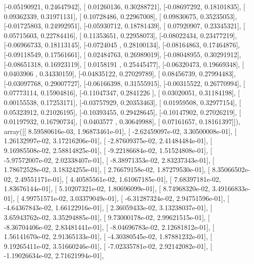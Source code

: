 \documentclass{article}
\begin{document}
       [-0.05190921,  0.24647942],
       [ 0.01260136,  0.30288721],
       [-0.08697292,  0.18101835],
       [ 0.09362339,  0.31971131],
       [ 0.10728486,  0.22967008],
       [ 0.09830675,  0.35235053],
       [-0.01725803,  0.24992951],
       [-0.05930712,  0.18781439],
       [ 0.07920907,  0.23345321],
       [ 0.05715603,  0.22784416],
       [ 0.11353651,  0.22958073],
       [-0.08022434,  0.23477219],
       [-0.06966733,  0.18113145],
       [-0.0724045 ,  0.28100134],
       [-0.08164863,  0.17464876],
       [-0.09118549,  0.17561661],
       [ 0.02484763,  0.26989019],
       [-0.08048955,  0.30291912],
       [-0.08651318,  0.16923119],
       [ 0.0158191 ,  0.25445477],
       [-0.06320473,  0.19669348],
       [ 0.0403906 ,  0.34330159],
       [-0.04835122,  0.27029789],
       [ 0.08456739,  0.27994483],
       [-0.03097768,  0.29007727],
       [-0.06166398,  0.31555915],
       [-0.00315522,  0.26770994],
       [ 0.07773114,  0.15904816],
       [-0.11047347,  0.2841226 ],
       [ 0.03020051,  0.31184198],
       [ 0.00155538,  0.17253171],
       [-0.03757929,  0.20353463],
       [ 0.01959508,  0.32977154],
       [ 0.05323912,  0.21026195],
       [-0.10393455,  0.29428645],
       [-0.10147902,  0.27026219],
       [ 0.01197932,  0.16790734],
       [ 0.0403577 ,  0.30649988],
       [ 0.07161657,  0.18161397]]), array([[  8.59580616e-03,   1.96873461e-01],
       [ -2.62459097e-02,   3.30500008e-01],
       [  1.26132997e-02,   3.17216206e-01],
       [ -2.87609375e-02,   2.41484484e-01],
       [  9.16985508e-02,   2.58814825e-01],
       [ -9.22186684e-02,   1.51524808e-01],
       [ -5.97572007e-02,   2.02338407e-01],
       [ -8.38971353e-02,   2.83237343e-01],
       [  1.78672528e-02,   3.18324255e-01],
       [  2.76679158e-02,   1.87279530e-01],
       [  8.35066502e-02,   2.49551171e-01],
       [  4.40585561e-02,   1.61067185e-01],
       [  7.68397181e-02,   1.83676144e-01],
       [  5.10207321e-02,   1.80696099e-01],
       [  8.74968320e-02,   3.49166833e-01],
       [  4.99751571e-02,   3.03379049e-01],
       [ -6.31287324e-02,   2.94751596e-01],
       [ -4.64367843e-02,   1.66122916e-01],
       [  2.36059433e-02,   3.13238037e-01],
       [  3.65943762e-02,   3.35294885e-01],
       [  9.73000178e-02,   2.99621515e-01],
       [ -8.36704406e-02,   2.83481441e-01],
       [ -8.04696783e-02,   2.12681812e-01],
       [  1.56141670e-02,   2.91365133e-01],
       [ -4.30380545e-02,   1.87881232e-01],
       [  9.19265411e-02,   3.51660246e-01],
       [ -7.02335781e-02,   2.92142082e-01],
       [ -1.19026634e-02,   2.71621994e-01],
\end{document}
